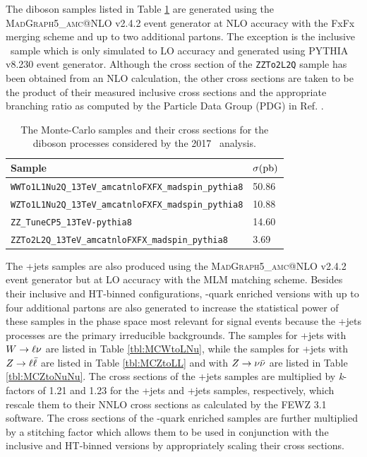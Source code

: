 The diboson samples listed in Table \ref{tbl:MCdiboson} are generated using the \textsc{\small MadGraph5\_amc@NLO} v2.4.2\cite{AMCNLO} event generator at NLO accuracy with the FxFx\cite{FXFX} merging scheme and up to two additional partons. The exception is the inclusive \bosZ\bosZ\ sample which is only simulated to LO accuracy and generated using \textsc{\small PYTHIA} v8.230\cite{PYTHIA8} event generator. Although the cross section of the \texttt{ZZTo2L2Q} sample has been obtained from an NLO calculation, the other cross sections are taken to be the product of their measured inclusive cross sections\cite{WWxsec,WZxsec,ZZxsec} and the appropriate branching ratio as computed by the Particle Data Group (PDG) in Ref. \cite{PDG2018}.

\begin{table}[htbp]
  \caption[Diboson Samples for \VHbb\ 2017]{The Monte-Carlo samples and their cross sections for the diboson processes considered by the 2017 \VHbb\ analysis.}
  \label{tbl:MCdiboson}
  \begin{tabularx}{6.5in}{lX}
    \hline
    Sample                                                      & $\sigma (\mathrm{pb})$ \\
    \hline
    \texttt{WWTo1L1Nu2Q\_13TeV\_amcatnloFXFX\_madspin\_pythia8} & 50.86          \\
    \texttt{WZTo1L1Nu2Q\_13TeV\_amcatnloFXFX\_madspin\_pythia8} & 10.88          \\
    \texttt{ZZ\_TuneCP5\_13TeV-pythia8}                         & 14.60          \\
    \texttt{ZZTo2L2Q\_13TeV\_amcatnloFXFX\_madspin\_pythia8}    & 3.69           \\
    \hline
  \end{tabularx}
\end{table}

The \bosV+jets samples are also produced using the \textsc{\small MadGraph5\_amc@NLO} v2.4.2 event generator but at LO accuracy with the MLM matching scheme\cite{MLM}. Besides their inclusive and HT-binned configurations, \qrkb-quark enriched versions with up to four additional partons are also generated to increase the statistical power of these samples in the phase space most relevant for signal events because the \bosV+jets processes are the primary irreducible backgrounds. The samples for \bosW+jets with $W \rightarrow \ell\nu$ are listed in Table \ref{tbl:MCWtoLNu}, while the samples for \bosZ+jets with $Z \rightarrow \ell\bar{\ell}$ are listed in Table \ref{tbl:MCZtoLL} and with $Z \rightarrow \nu\bar{\nu}$ are listed in Table \ref{tbl:MCZtoNuNu}. The cross sections of the \bosV+jets samples are multiplied by \textit{k}-factors of 1.21 and 1.23 for the \bosW+jets and \bosZ+jets samples, respectively, which rescale them to their NNLO cross sections as calculated by the \textsc{\small FEWZ} 3.1\cite{FEWZA,FEWZB,FEWZC} software. The cross sections of the \qrkb-quark enriched samples are further multiplied by a stitching factor which allows them to be used in conjunction with the inclusive and HT-binned versions by appropriately scaling their cross sections.

